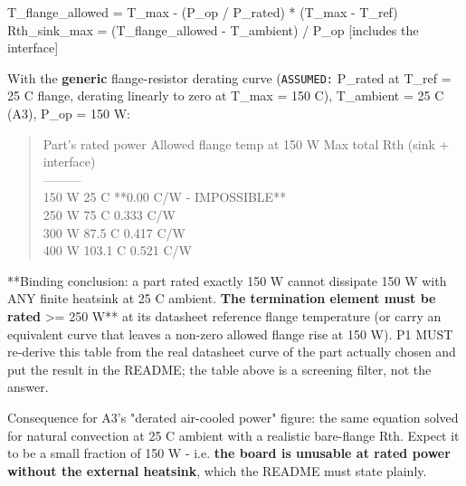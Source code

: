\documentclass[11pt,a4paper]{article}
\begin{document}
T\_flange\_allowed = T\_max - (P\_op / P\_rated) {*} (T\_max - T\_ref) Rth\_sink\_max     = (T\_flange\_allowed - T\_ambient) / P\_op        {[}includes the interface{]}

With the \textbf{generic} flange-resistor derating curve (\texttt{ASSUMED:} P\_rated at T\_ref = 25 C flange, derating linearly to zero at T\_max = 150 C), T\_ambient = 25 C (A3), P\_op = 150 W:

\begin{quote}\small\ttfamily\raggedright
\textbar{} Part's rated power \textbar{} Allowed flange temp at 150 W \textbar{} Max total Rth (sink + interface) \textbar{}\\
\textbar{}---\textbar{}---\textbar{}---\textbar{}\\
\textbar{} 150 W \textbar{} 25 C \textbar{} {*}{*}0.00 C/W - IMPOSSIBLE{*}{*} \textbar{}\\
\textbar{} 250 W \textbar{} 75 C \textbar{} 0.333 C/W \textbar{}\\
\textbar{} 300 W \textbar{} 87.5 C \textbar{} 0.417 C/W \textbar{}\\
\textbar{} 400 W \textbar{} 103.1 C \textbar{} 0.521 C/W \textbar{}
\end{quote}
{*}{*}Binding conclusion: a part rated exactly 150 W cannot dissipate 150 W with ANY finite heatsink at 25 C ambient.\textbf{ The termination element must be rated }\textgreater{}= 250 W{*}{*} at its datasheet reference flange temperature (or carry an equivalent curve that leaves a non-zero allowed flange rise at 150 W). P1 MUST re-derive this table from the real datasheet curve of the part actually chosen and put the result in the README; the table above is a screening filter, not the answer.

Consequence for A3's "derated air-cooled power" figure: the same equation solved for natural convection at 25 C ambient with a realistic bare-flange Rth. Expect it to be a small fraction of 150 W - i.e. \textbf{the board is unusable at rated power without the external heatsink}, which the README must state plainly.
\end{document}
